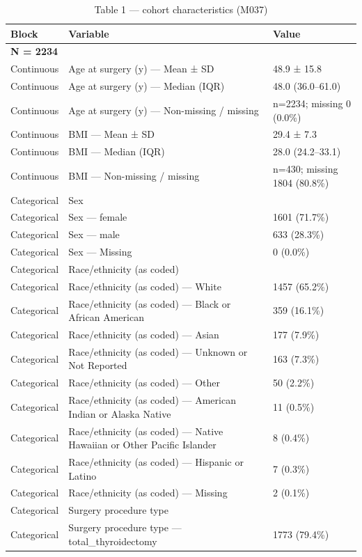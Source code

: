\begin{table}[htbp]
\centering
\caption{Table 1 — cohort characteristics (M037)}
\label{tab:table1\_m037}
\begin{tabular}{lll}
\toprule
Block & Variable & Value \\
\midrule
\multicolumn{3}{l}{\textbf{N = 2234}} \\
Continuous & Age at surgery (y) — Mean ± SD & 48.9 ± 15.8 \\
Continuous & Age at surgery (y) — Median (IQR) & 48.0 (36.0–61.0) \\
Continuous & Age at surgery (y) — Non-missing / missing & n=2234; missing 0 (0.0\%) \\
Continuous & BMI — Mean ± SD & 29.4 ± 7.3 \\
Continuous & BMI — Median (IQR) & 28.0 (24.2–33.1) \\
Continuous & BMI — Non-missing / missing & n=430; missing 1804 (80.8\%) \\
Categorical & Sex &  \\
Categorical & Sex — female & 1601 (71.7\%) \\
Categorical & Sex — male & 633 (28.3\%) \\
Categorical & Sex — Missing & 0 (0.0\%) \\
Categorical & Race/ethnicity (as coded) &  \\
Categorical & Race/ethnicity (as coded) — White & 1457 (65.2\%) \\
Categorical & Race/ethnicity (as coded) — Black or African American & 359 (16.1\%) \\
Categorical & Race/ethnicity (as coded) — Asian & 177 (7.9\%) \\
Categorical & Race/ethnicity (as coded) — Unknown or Not Reported & 163 (7.3\%) \\
Categorical & Race/ethnicity (as coded) — Other & 50 (2.2\%) \\
Categorical & Race/ethnicity (as coded) — American Indian or Alaska Native & 11 (0.5\%) \\
Categorical & Race/ethnicity (as coded) — Native Hawaiian or Other Pacific Islander & 8 (0.4\%) \\
Categorical & Race/ethnicity (as coded) — Hispanic or Latino & 7 (0.3\%) \\
Categorical & Race/ethnicity (as coded) — Missing & 2 (0.1\%) \\
Categorical & Surgery procedure type &  \\
Categorical & Surgery procedure type — total\_thyroidectomy & 1773 (79.4\%) \\

\end{tabular}
\end{table}
